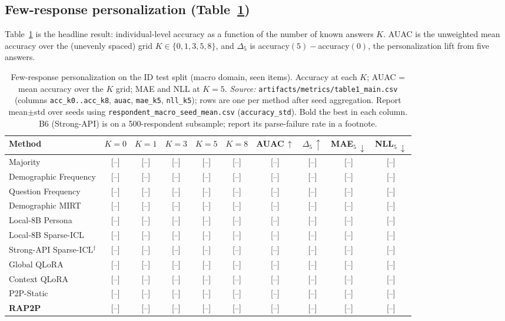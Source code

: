 \documentclass[letterpaper]{article} %
\begin{document}
\subsection{Few-response personalization (Table~\ref{tab:main})}
Table~\ref{tab:main} is the headline result: individual-level accuracy as a
function of the number of known answers $K$. AUAC is the unweighted mean
accuracy over the (unevenly spaced) grid $K\in\{0,1,3,5,8\}$, and $\Delta_5$ is
accuracy$(5)-$accuracy$(0)$, the personalization lift from five answers.

\begin{table}[t]
\centering
\caption{Few-response personalization on the ID test split (macro domain,
seen items). Accuracy at each $K$; AUAC = mean accuracy over the $K$ grid;
MAE and NLL at $K{=}5$. \emph{Source:}
\texttt{artifacts/metrics/table1\_main.csv} (columns \texttt{acc\_k0..acc\_k8},
\texttt{auac}, \texttt{mae\_k5}, \texttt{nll\_k5}); rows are one per method
after seed aggregation. Report mean$\pm$std over seeds using
\texttt{respondent\_macro\_seed\_mean.csv} (\texttt{accuracy\_std}). Bold the
best in each column. B6 (Strong-API) is on a 500-respondent subsample; report
its parse-failure rate in a footnote.}
\label{tab:main}
\setlength{\tabcolsep}{5pt}
\begin{tabular}{lccccccccc}
\toprule
Method & $K{=}0$ & $K{=}1$ & $K{=}3$ & $K{=}5$ & $K{=}8$ & AUAC\,$\uparrow$ & $\Delta_5\,\uparrow$ & MAE$_5\,\downarrow$ & NLL$_5\,\downarrow$ \\
\midrule
Majority                    & [--] & [--] & [--] & [--] & [--] & [--] & [--] & [--] & [--] \\
Demographic Frequency       & [--] & [--] & [--] & [--] & [--] & [--] & [--] & [--] & [--] \\
Question Frequency          & [--] & [--] & [--] & [--] & [--] & [--] & [--] & [--] & [--] \\
Demographic MIRT            & [--] & [--] & [--] & [--] & [--] & [--] & [--] & [--] & [--] \\
Local-8B Persona            & [--] & [--] & [--] & [--] & [--] & [--] & [--] & [--] & [--] \\
Local-8B Sparse-ICL         & [--] & [--] & [--] & [--] & [--] & [--] & [--] & [--] & [--] \\
Strong-API Sparse-ICL$^{\dagger}$ & [--] & [--] & [--] & [--] & [--] & [--] & [--] & [--] & [--] \\
Global QLoRA                & [--] & [--] & [--] & [--] & [--] & [--] & [--] & [--] & [--] \\
Context QLoRA               & [--] & [--] & [--] & [--] & [--] & [--] & [--] & [--] & [--] \\
P2P-Static                  & [--] & [--] & [--] & [--] & [--] & [--] & [--] & [--] & [--] \\
\textbf{RAP2P}              & [--] & [--] & [--] & [--] & [--] & [--] & [--] & [--] & [--] \\
\bottomrule
\end{tabular}
\end{table}
\end{document}
